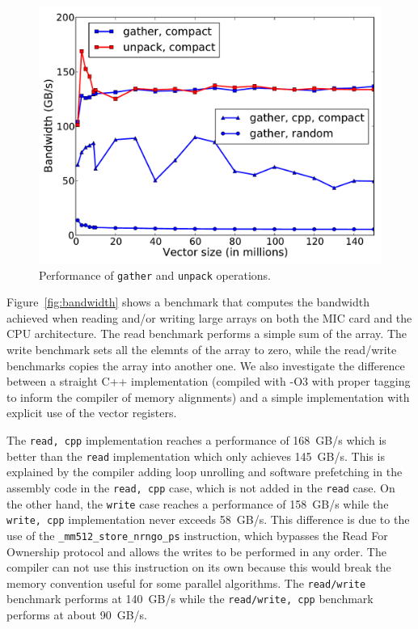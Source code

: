 \documentclass{sig-alternate}
\begin{document}
\begin{figure}[t]
  \centering
  \includegraphics[width=.9\linewidth]{figures/bandwidth_gather_unpack.pdf}
  \caption{Performance of {\tt gather} and {\tt unpack} operations.}
  \label{fig:band_gather} 
\end{figure}


Figure~\ref{fig:bandwidth} shows a benchmark that computes the
bandwidth achieved when reading and/or writing large arrays on both
the MIC card and the CPU architecture. The read benchmark performs a
simple sum of the array. The write benchmark sets all the elemnts of
the array to zero, while the read/write benchmarks copies the array into
another one. We also investigate the difference between a straight C++
implementation (compiled with \mbox{-O3} with proper tagging to inform the
compiler of memory alignments) and a simple implementation with
explicit use of the vector registers.

The {\tt read, cpp} implementation reaches a performance of 168~GB/s
 which is better than the {\tt read}
implementation which only achieves 145~GB/s. This
is explained by the compiler adding loop unrolling and software
prefetching in the assembly code in the {\tt read, cpp} case, which is
not added in the {\tt read} case. On the other hand, the {\tt write}
case reaches a performance of 158~GB/s while the
{\tt write, cpp} implementation never exceeds 58~GB/s. 
This difference is due to the use of the {\tt \_mm512\_store\_nrngo\_ps} instruction, 
which bypasses the Read For Ownership protocol and allows the writes
to be performed in any order. The compiler can not use this
instruction on its own because this would break the memory convention
useful for some parallel algorithms. The {\tt read/write} benchmark
performs at 140~GB/s while the {\tt read/write, cpp} benchmark performs
at about 90~GB/s.
\end{document}
